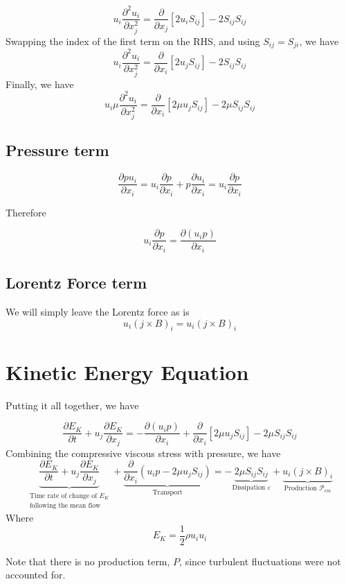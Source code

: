 \documentclass[11pt]{article}
\newcommand{\PD}{\partial}
\begin{document}
\begin{equation}
	u_i \frac{\PD^2 u_i}{\PD x_j^2} = 
	\frac{\PD}{\PD x_j} \left[ 2 u_i S_{ij} \right] - 
	2 S_{ij} S_{ij}
\end{equation}
Swapping the index of the first term on the RHS, and using $S_{ij}=S_{ji}$, we have
\begin{equation}
	u_i \frac{\PD^2 u_i}{\PD x_j^2} = 
	\frac{\PD}{\PD x_i} \left[ 2 u_j S_{ij} \right] - 
	2 S_{ij} S_{ij}
\end{equation}
Finally, we have
\begin{equation}
	\boxed{
	u_i \mu \frac{\PD^2 u_i}{\PD x_j^2} = 
	\frac{\PD}{\PD x_i} \left[ 2 \mu u_j S_{ij} \right] - 
	2 \mu S_{ij} S_{ij}
	}
\end{equation}


\subsection{Pressure term}
\begin{equation}
	\frac{\PD p u_i}{\PD x_i}
	=
	u_i \frac{\PD p}{\PD x_i}
	+
	p \frac{\PD u_i}{\PD x_i}
	=
	u_i \frac{\PD p}{\PD x_i}
\end{equation}

Therefore

\begin{equation}
	\boxed{
	u_i \frac{\PD p}{\PD x_i} =
	\frac{\PD (u_i p)}{\PD x_i}
	}
\end{equation}

\subsection{Lorentz Force term}
We will simply leave the Lorentz force as is
\begin{equation}
	\boxed{
	u_i (j \times B)_i = u_i (j \times B)_i
	}
\end{equation}

\section{Kinetic Energy Equation}
Putting it all together, we have

\begin{equation}
	\frac{\PD E_K}{\PD t} + 
	u_j \frac{\PD E_K}{\PD x_j} = 
	- \frac{\PD (u_i p)}{\PD x_i} + 
	\frac{\PD}{\PD x_i} \left[ 2 \mu u_j S_{ij} \right] - 
	2 \mu S_{ij} S_{ij}
\end{equation}
Combining the compressive viscous stress with pressure, we have
\begin{equation}
	\boxed{
	\underbrace{\frac{\PD E_K}{\PD t} + u_j \frac{\PD E_K}{\PD x_j}}_
	{\substack{\text{Time rate of change of $E_K$}\\\text{following the mean flow}}} +
	\underbrace{\frac{\PD}{\PD x_i} \left( u_i p - 2 \mu u_j S_{ij} \right)}_{\text{Transport}} = 
	- \underbrace{2 \mu S_{ij} S_{ij}}_{\text{Dissipation } \varepsilon} + 
	\underbrace{u_i (j \times B)_i}_{\text{Production } \mathcal P_{em}}
	}
\end{equation}
Where
\begin{equation}
	E_K = \frac{1}{2} \rho u_i u_i
\end{equation}

Note that there is no production term, $P$, since turbulent fluctuations were not accounted for.
\end{document}
